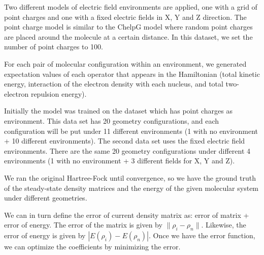 \documentclass[twoside]{article}
\begin{document}
Two different models of electric field environments are applied, one with a grid of point charges and one with a fixed electric fields in X, Y and Z direction. The point charge model is similar to the ChelpG model\cite{ChelpG} where random point charges are placed around the molecule at a certain distance. In this dataset, we set the number of point charges to 100.
 





For each pair of molecular configuration within an environment, we generated expectation values of each operator that appears in the Hamiltonian (total kinetic energy, interaction of the electron density with each nucleus, and total two-electron repulsion energy).

Initially the model was trained on the dataset which has point charges as environment. This data set has 20 geometry configurations, and each configuration will be put under 11 different environments (1 with no environment + 10 different environments). The second data set uses the fixed electric field environments. There are the same 20 geometry configurations under different 4 environments (1 with no environment + 3 different fields for X, Y and Z). 


We ran the original Hartree-Fock until convergence, so we have the ground truth of the steady-state density matrices and the energy of the given molecular system under different geometries. 

We can in turn define the error of current density matrix as: error of matrix +  error of energy. The error of the matrix is given by $\|\rho_i-\rho_n\|$. Likewise, the error of energy is given by $|E(\rho_i)-E(\rho_n)|$. Once we have the error function, we can optimize the coefficients by minimizing the error.

\end{document}
